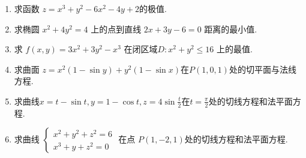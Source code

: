 \begin{enumerate}
	
	\item 求函数 $z = x^3 + y^2 - 6x^2 - 4y + 2$的极值.

	\item 求椭圆 $x^2 + 4y^2 = 4$ 上的点到直线 $2x+3y-6=0$ 距离的最小值.

	\item 求 $f(x,y) = 3x^2 + 3y^2 - x^3$ 在闭区域$D: x^2 + y^2 \leq 16$ 上的最值.

	\item 求曲面 $z = x^2(1-\sin y) + y^2(1-\sin x)$在$P(1,0,1)$处的切平面与法线方程.

	
	\item 求曲线$x=t-\sin t, y=1-\cos t, z=4\sin \frac{t}{2}$在$t=\frac{\pi}{2}$处的切线方程和法平面方程.

	\item 求曲线 $\begin{cases} x^2+y^2+z^2=6 \\ x^3+y+z^2=0 \end{cases}$ 在点 $P(1, -2, 1)$处的切线方程和法平面方程.

\end{enumerate}

\newpage

